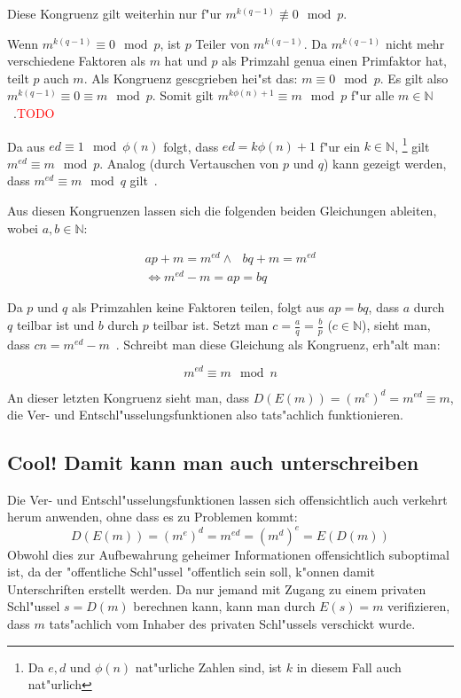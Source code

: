 \documentclass[12pt]{article}
\newcommand{\todo}[1]{\textcolor{red}{\mbox{TODO}}\marginpar{\textcolor{red}{#1}}}
\begin{document}
Diese Kongruenz gilt weiterhin nur f"ur $m^{k(q-1)} \not\equiv 0 \mod p$.

Wenn $m^{k(q-1)} \equiv 0 \mod p$, ist $p$ Teiler von $m^{k(q-1)}$.
Da $m^{k(q-1)}$ nicht mehr verschiedene Faktoren als $m$ hat und $p$ als Primzahl
genua einen Primfaktor hat, teilt $p$ auch $m$.
Als Kongruenz gescgrieben hei"st das: $m \equiv 0 \mod p$.
Es gilt also $m^{k(q-1)} \equiv 0 \equiv m \mod p$.
Somit gilt $m^{k\phi(n)+1} \equiv m \mod p$ f"ur alle $m \in \mathbb{N}$~\cite{rsa}.\todo{So OK?}

Da aus $ed \equiv 1 \mod \phi(n)$ folgt, dass $ed = k\phi(n) +1$ f"ur ein $k \in \mathbb{N}$,%
\footnote{Da $e, d$ und $\phi(n)$ nat"urliche Zahlen sind, ist $k$ in diesem Fall auch nat"urlich}
gilt $m^{ed} \equiv m \mod p$.
Analog (durch Vertauschen von $p$ und $q$) kann gezeigt werden,
dass $m^{ed} \equiv m \mod q$ gilt~\cite{rsa}.

Aus diesen Kongruenzen lassen sich die folgenden beiden Gleichungen ableiten,
wobei $a, b \in \mathbb{N}$:

\[
\begin{aligned}
ap + m = m^{ed} \land ~~~ bq + m = m^{ed} \\
\iff m^{ed} - m = ap = bq
\end{aligned}
\]

Da $p$ und $q$ als Primzahlen keine Faktoren teilen, folgt aus $ap = bq$,
dass $a$ durch $q$ teilbar ist und $b$ durch $p$ teilbar ist.
Setzt man $c = \frac{a}{q} = \frac{b}{p}$ ($c \in \mathbb{N}$),
sieht man, dass $cn = m^{ed} - m$~\cite{pii1}.
Schreibt man diese Gleichung als Kongruenz, erh"alt man:

\[
m^{ed} \equiv m \mod n
\]

An dieser letzten Kongruenz sieht man, dass $D(E(m)) = (m^e)^d = m^{ed} \equiv m$,
die Ver- und Entschl"usselungsfunktionen also tats"achlich funktionieren.

\subsection{Cool! Damit kann man auch unterschreiben}

Die Ver- und Entschl"usselungsfunktionen lassen sich offensichtlich
auch verkehrt herum anwenden, ohne dass es zu Problemen kommt:
\[D(E(m)) = (m^e)^d = m^{ed} = (m^d)^e = E(D(m))\]
Obwohl dies zur Aufbewahrung geheimer Informationen offensichtlich suboptimal ist,
da der "offentliche Schl"ussel "offentlich sein soll, k"onnen damit Unterschriften erstellt werden.
Da nur jemand mit Zugang zu einem privaten Schl"ussel $s = D(m)$ berechnen kann,
kann man durch $E(s) = m$ verifizieren, dass $m$ tats"achlich vom
Inhaber des privaten Schl"ussels verschickt wurde.
\end{document}
